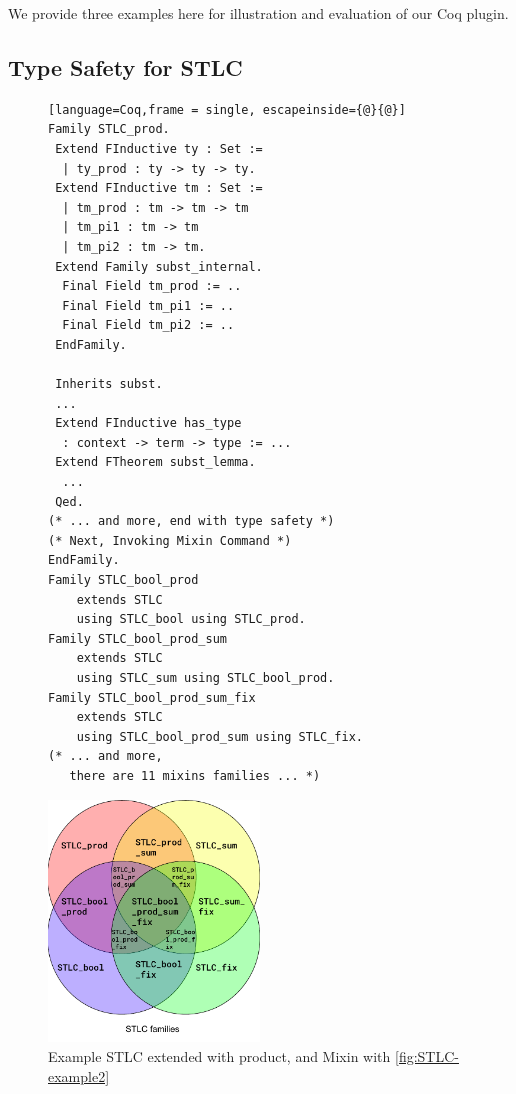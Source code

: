 \newpage{}
We provide three examples here for illustration and evaluation of our Coq plugin. 

\subsection{Type Safety for STLC}
\label{sec:coqexample-stlc}

\begin{figure}
\begin{lstlisting}[language=Coq,frame = single, escapeinside={@}{@}]
Family STLC_prod.
 Extend FInductive ty : Set :=
  | ty_prod : ty -> ty -> ty.
 Extend FInductive tm : Set :=
  | tm_prod : tm -> tm -> tm  
  | tm_pi1 : tm -> tm  
  | tm_pi2 : tm -> tm.
 Extend Family subst_internal.
  Final Field tm_prod := ..
  Final Field tm_pi1 := ..
  Final Field tm_pi2 := ..
 EndFamily.

 Inherits subst.
 ...
 Extend FInductive has_type 
  : context -> term -> type := ...
 Extend FTheorem subst_lemma.
  ... 
 Qed.
(* ... and more, end with type safety *)
(* Next, Invoking Mixin Command *)
EndFamily.
Family STLC_bool_prod 
    extends STLC 
    using STLC_bool using STLC_prod.
Family STLC_bool_prod_sum 
    extends STLC 
    using STLC_sum using STLC_bool_prod.
Family STLC_bool_prod_sum_fix 
    extends STLC 
    using STLC_bool_prod_sum using STLC_fix.
(* ... and more, 
   there are 11 mixins families ... *)
\end{lstlisting}
\includegraphics[width=0.5\textwidth]{coqexmaple/Mixin-Venn-Diagram.pdf}
\caption{Example STLC extended with product, and Mixin with \cref{fig:STLC-example2}}
\end{figure}

